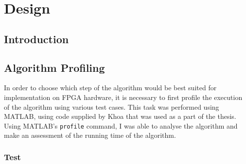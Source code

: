 \chapter{Design}
\label{ch:design}

\section{Introduction}
\label{sec:designIntroduction}

\section{Algorithm Profiling}
\label{sec:algorithmProfiling}
In order to choose which step of the algorithm would be best suited for 
implementation on FPGA hardware, it is necessary to first profile the execution 
of the algorithm using various test cases. This task was performed using MATLAB,
using code supplied by Khoa that was used as a part of the thesis. Using 
MATLAB's \verb+profile+ command, I was able to analyse the algorithm and make an
assessment of the running time of the algorithm.

\subsection{Test}

